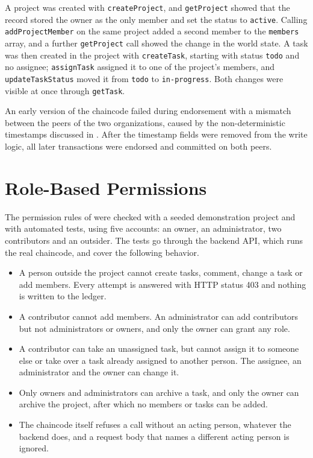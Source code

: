 A project was created with \texttt{createProject}, and \texttt{getProject} showed that the record stored the owner as the only member and set the status to \texttt{active}. Calling \texttt{addProjectMember} on the same project added a second member to the \texttt{members} array, and a further \texttt{getProject} call showed the change in the world state. A task was then created in the project with \texttt{createTask}, starting with status \texttt{todo} and no assignee; \texttt{assignTask} assigned it to one of the project's members, and \texttt{updateTaskStatus} moved it from \texttt{todo} to \texttt{in-progress}. Both changes were visible at once through \texttt{getTask}.

An early version of the chaincode failed during endorsement with a mismatch between the peers of the two organizations, caused by the non-deterministic timestamps discussed in . After the timestamp fields were removed from the write logic, all later transactions were endorsed and committed on both peers.

\section{Role-Based Permissions}
\label{sec:results-permissions}

The permission rules of  were checked with a seeded demonstration project and with automated tests, using five accounts: an owner, an administrator, two contributors and an outsider. The tests go through the backend API, which runs the real chaincode, and cover the following behavior.

\begin{itemize}
    \item A person outside the project cannot create tasks, comment, change a task or add members. Every attempt is answered with HTTP status 403 and nothing is written to the ledger.
    \item A contributor cannot add members. An administrator can add contributors but not administrators or owners, and only the owner can grant any role.
    \item A contributor can take an unassigned task, but cannot assign it to someone else or take over a task already assigned to another person. The assignee, an administrator and the owner can change it.
    \item Only owners and administrators can archive a task, and only the owner can archive the project, after which no members or tasks can be added.
    \item The chaincode itself refuses a call without an acting person, whatever the backend does, and a request body that names a different acting person is ignored.
\end{itemize}

